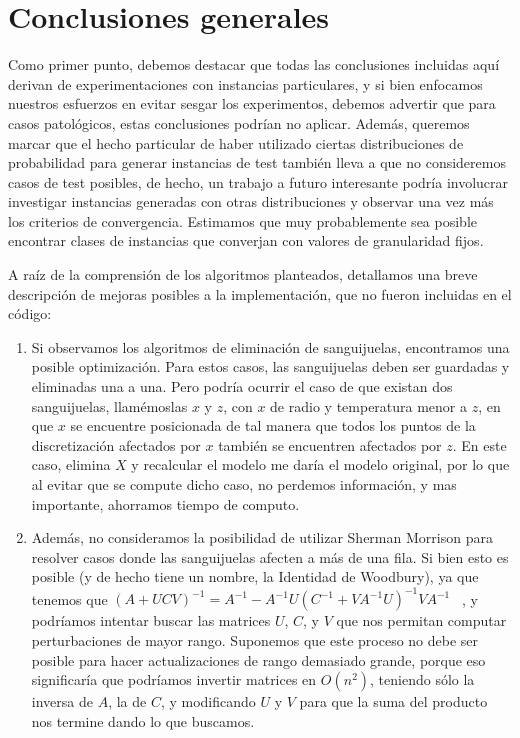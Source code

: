 \section{Conclusiones generales}

Como primer punto, debemos destacar que todas las conclusiones incluidas aquí derivan de experimentaciones con instancias particulares, y si bien enfocamos nuestros esfuerzos en evitar sesgar los experimentos, debemos advertir que para casos patológicos, estas conclusiones podrían no aplicar. Además, queremos marcar que el hecho particular de haber utilizado ciertas distribuciones de probabilidad para generar instancias de test también lleva a que no consideremos casos de test posibles, de hecho, un trabajo a futuro interesante podría involucrar investigar instancias generadas con otras distribuciones y observar una vez más los criterios de convergencia. Estimamos que muy probablemente sea posible encontrar clases de instancias que converjan con valores de granularidad fijos.

A raíz de la comprensión de los algoritmos planteados, detallamos una breve descripción de mejoras posibles a la implementación, que no fueron incluidas en el código:

\begin{enumerate}
\item Si observamos los algoritmos de eliminación de sanguijuelas, encontramos una posible optimización. Para estos casos, las sanguijuelas deben ser guardadas y eliminadas una a una. Pero podría ocurrir el caso de que existan dos sanguijuelas, llamémoslas $x$ y $z$, con $x$ de radio y temperatura menor a $z$, en que $x$ se encuentre posicionada de tal manera que todos los puntos de la discretizaci\'on afectados por $x$ también se encuentren afectados por $z$. En este caso, elimina $X$ y recalcular el modelo me daría el modelo original, por lo que al evitar que se compute dicho caso, no perdemos información, y mas importante, ahorramos tiempo de computo.

\item Además, no consideramos la posibilidad de utilizar Sherman Morrison para resolver casos donde las sanguijuelas afecten a más de una fila. Si bien esto es posible (y de hecho tiene un nombre, la Identidad de Woodbury), ya que tenemos que $(A + UCV)^{-1} = A^{-1} - A^{-1} U (C^{-1} + V A^{-1} U)^{-1} V A^{-1}$ ~\cite[p.~330]{woodbury}, y podríamos intentar buscar las matrices $U$, $C$, y $V$ que nos permitan computar perturbaciones de mayor rango. Suponemos que este proceso no debe ser posible para hacer actualizaciones de rango demasiado grande, porque eso significaría que podríamos invertir matrices en $O(n^2)$, teniendo sólo la inversa de $A$, la de $C$, y modificando $U$ y $V$ para que la suma del producto nos termine dando lo que buscamos.
\end{enumerate}

